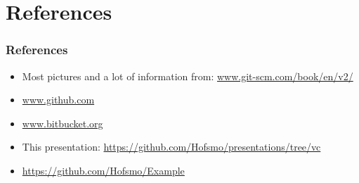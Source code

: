 \section[References]{References}
\begin{frame}
	\frametitle{References}
	\begin{itemize}
		\item Most pictures and a lot of information from:
				\url{www.git-scm.com/book/en/v2/}
		\item \url{www.github.com}
		\item \url{www.bitbucket.org}
		\item This presentation:
				\url{https://github.com/Hofsmo/presentations/tree/vc}
		\item \url{https://github.com/Hofsmo/Example}
	\end{itemize}
\end{frame}
